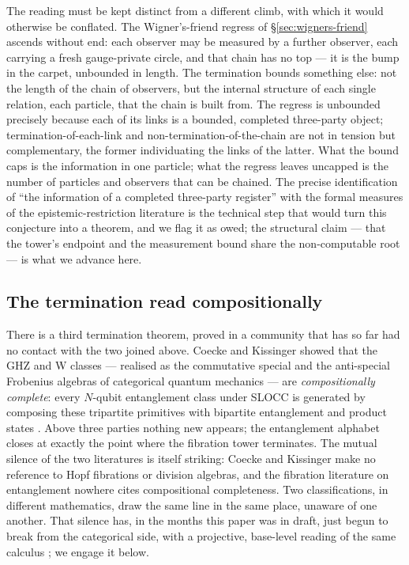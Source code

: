 The reading must be kept distinct from a different climb, with which it would otherwise be conflated.
The Wigner's-friend regress of \S\ref{sec:wigners-friend} ascends without end: each observer may be
measured by a further observer, each carrying a fresh gauge-private circle, and that chain has no top
--- it is the bump in the carpet, unbounded in length. The termination bounds something else: not the
length of the chain of observers, but the internal structure of each single relation, each particle,
that the chain is built from. The regress is unbounded precisely because each of its links is a
bounded, completed three-party object; termination-of-each-link and non-termination-of-the-chain are
not in tension but complementary, the former individuating the links of the latter. What the bound
caps is the information in one particle; what the regress leaves uncapped is the number of particles
and observers that can be chained. The precise identification of ``the information of a completed
three-party register'' with the formal measures of the epistemic-restriction literature is the
technical step that would turn this conjecture into a theorem, and we flag it as owed; the structural
claim --- that the tower's endpoint and the measurement bound share the non-computable root --- is
what we advance here.

\subsection{The termination read compositionally}
\label{sec:hopf-compositional}

There is a third termination theorem, proved in a community that has so far had no contact with the
two joined above. Coecke and Kissinger showed that the GHZ and W classes --- realised as the
commutative special and the anti-special Frobenius algebras of categorical quantum mechanics --- are
\emph{compositionally complete}: every $N$-qubit entanglement class under SLOCC is generated by
composing these tripartite primitives with bipartite entanglement and product states
\autocite{coeckekissinger2010compositional}. Above three parties nothing new appears; the
entanglement alphabet closes at exactly the point where the fibration tower terminates. The mutual
silence of the two literatures is itself striking: Coecke and Kissinger make no reference to Hopf
fibrations or division algebras, and the fibration literature on entanglement
\autocite{mosseri2001hopf,bernevigchen2003geometry} nowhere cites compositional completeness. Two
classifications, in different mathematics, draw the same line in the same place, unaware of one
another. That silence has, in the months this paper was in draft, just begun to break from the
categorical side, with a projective, base-level reading of the same calculus
\autocite{burtonanwar2026meromorphic}; we engage it below.


